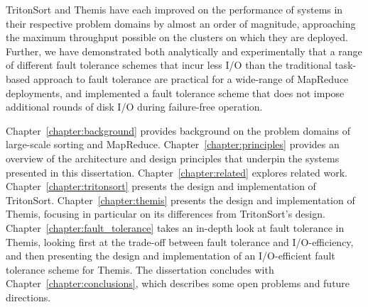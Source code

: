 TritonSort and Themis have each improved on the performance of systems in their
respective problem domains by almost an order of magnitude, approaching the
maximum throughput possible on the clusters on which they are
deployed. Further, we have demonstrated both analytically and experimentally
that a range of different fault tolerance schemes that incur less I/O than the
traditional task-based approach to fault tolerance are practical for a
wide-range of MapReduce deployments, and implemented a fault tolerance scheme
that does not impose additional rounds of disk I/O during failure-free
operation.

Chapter~\ref{chapter:background} provides background on the problem domains of
large-scale sorting and MapReduce. Chapter~\ref{chapter:principles} provides an
overview of the architecture and design principles that underpin the systems
presented in this dissertation. Chapter~\ref{chapter:related} explores related
work.  Chapter~\ref{chapter:tritonsort} presents the design and implementation
of TritonSort. Chapter~\ref{chapter:themis} presents the design and
implementation of Themis, focusing in particular on its differences from
TritonSort's design. Chapter~\ref{chapter:fault_tolerance} takes an in-depth
look at fault tolerance in Themis, looking first at the trade-off between fault
tolerance and I/O-efficiency, and then presenting the design and implementation
of an I/O-efficient fault tolerance scheme for Themis. The dissertation
concludes with Chapter~\ref{chapter:conclusions}, which describes some open
problems and future directions.
